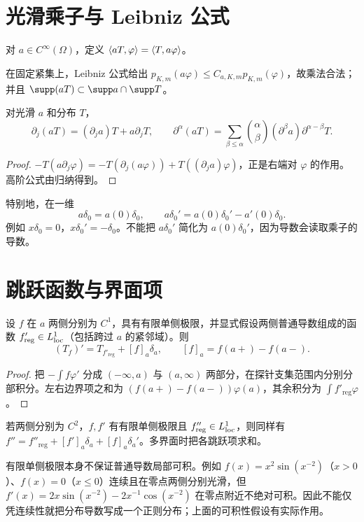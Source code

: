 \section{光滑乘子与 Leibniz 公式}
\begin{definition}[与光滑函数相乘]
对 $a\in C^\infty(\Omega)$，定义 $\langle aT,\varphi\rangle=\langle T,a\varphi\rangle$。
\end{definition}
在固定紧集上，Leibniz 公式给出 $p_{K,m}(a\varphi)\le C_{a,K,m}p_{K,m}(\varphi)$，故乘法合法；并且 $\supp(aT)\subset\supp a\cap\supp T$。
\begin{proposition}[乘积求导]
对光滑 $a$ 和分布 $T$，
\[
 \partial_j(aT)=(\partial_ja)T+a\partial_jT,
 \qquad
 \partial^\alpha(aT)=\sum_{\beta\le\alpha}\binom\alpha\beta
 (\partial^\beta a)\partial^{\alpha-\beta}T.
\]
\end{proposition}
\begin{proof}
$-T(a\partial_j\varphi)=-T(\partial_j(a\varphi))+T((\partial_ja)\varphi)$，正是右端对 $\varphi$ 的作用。高阶公式由归纳得到。
\end{proof}
特别地，在一维
\[
 a\delta_0=a(0)\delta_0,\qquad
 a\delta_0'=a(0)\delta_0'-a'(0)\delta_0.
\]
例如 $x\delta_0=0$，$x\delta_0'=-\delta_0$。不能把 $a\delta_0'$ 简化为 $a(0)\delta_0'$，因为导数会读取乘子的导数。

\section{跳跃函数与界面项}
\begin{proposition}[一维跳跃公式]
设 $f$ 在 $a$ 两侧分别为 $C^1$，具有有限单侧极限，并显式假设两侧普通导数组成的函数 $f'_{\mathrm{reg}}\in L^1_{\mathrm{loc}}$（包括跨过 $a$ 的紧邻域）。则
\begin{equation}\label{eq:jump}
 (T_f)'=T_{f'_{\mathrm{reg}}}+[f]_a\delta_a,
 \qquad [f]_a=f(a+)-f(a-).
\end{equation}
\end{proposition}
\begin{proof}
把 $-\int f\varphi'$ 分成 $(-\infty,a)$ 与 $(a,\infty)$ 两部分，在探针支集范围内分别分部积分。左右边界项之和为 $(f(a+)-f(a-))\varphi(a)$，其余积分为 $\int f'_{\mathrm{reg}}\varphi$。
\end{proof}
若两侧分别为 $C^2$，$f,f'$ 有有限单侧极限且 $f''_{\mathrm{reg}}\in L^1_{\mathrm{loc}}$，则同样有 $f''=f''_{\mathrm{reg}}+[f']_a\delta_a+[f]_a\delta_a'$。多界面时把各跳跃项求和。

有限单侧极限本身不保证普通导数局部可积。例如 $f(x)=x^2\sin(x^{-2})$（$x>0$）、$f(x)=0$（$x\le0$）连续且在零点两侧分别光滑，但 $f'(x)=2x\sin(x^{-2})-2x^{-1}\cos(x^{-2})$ 在零点附近不绝对可积。因此不能仅凭连续性就把分布导数写成一个正则分布；上面的可积性假设有实际作用。

